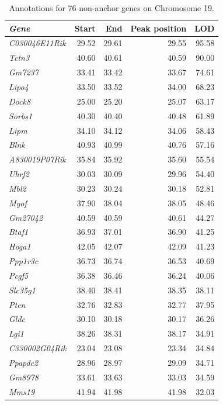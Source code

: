 \documentclass[oneside]{book}\usepackage[]{graphicx}\usepackage[]{color}
\begin{document}
\begin{appendices}
{\begin{longtable}{lrr}
  \label{tab:hot-annot}

\end{longtable}
}
\begin{table}[ht]
\caption{Annotations for 76 non-anchor genes on Chromosome 19.}\label{tab:ann76}
\centering
\begingroup\tiny
\begin{tabular}{>{\em}lrrrr}
  \hline
Gene & Start & End & Peak position & LOD \\
  \hline
C030046E11Rik & 29.52 & 29.61 & 29.55 & 95.58 \\
  Tctn3 & 40.60 & 40.61 & 40.59 & 90.00 \\
  Gm7237 & 33.41 & 33.42 & 33.67 & 74.61 \\
  Lipo4 & 33.50 & 33.52 & 34.00 & 68.23 \\
  Dock8 & 25.00 & 25.20 & 25.07 & 63.17 \\
  Sorbs1 & 40.30 & 40.40 & 40.48 & 61.89 \\
  Lipm & 34.10 & 34.12 & 34.06 & 58.43 \\
  Blnk & 40.93 & 40.99 & 40.76 & 57.16 \\
  A830019P07Rik & 35.84 & 35.92 & 35.60 & 55.54 \\
  Uhrf2 & 30.03 & 30.09 & 29.96 & 54.40 \\
  Mbl2 & 30.23 & 30.24 & 30.18 & 52.81 \\
  Myof & 37.90 & 38.04 & 38.05 & 48.46 \\
  Gm27042 & 40.59 & 40.59 & 40.61 & 44.27 \\
  Btaf1 & 36.93 & 37.01 & 36.90 & 41.25 \\
  Hoga1 & 42.05 & 42.07 & 42.09 & 41.23 \\
  Ppp1r3c & 36.73 & 36.74 & 36.53 & 40.69 \\
  Pcgf5 & 36.38 & 36.46 & 36.24 & 40.06 \\
  Slc35g1 & 38.40 & 38.41 & 38.35 & 38.11 \\
  Pten & 32.76 & 32.83 & 32.77 & 37.95 \\
  Gldc & 30.10 & 30.18 & 30.17 & 36.26 \\
  Lgi1 & 38.26 & 38.31 & 38.17 & 34.91 \\
  C330002G04Rik & 23.04 & 23.08 & 23.34 & 34.84 \\
  Ppapdc2 & 28.96 & 28.97 & 29.09 & 34.71 \\
  Gm8978 & 33.61 & 33.63 & 33.03 & 34.59 \\
  Mms19 & 41.94 & 41.98 & 41.98 & 32.03 \\

\end{tabular}
\end{table}
\end{appendices}
\end{document}
